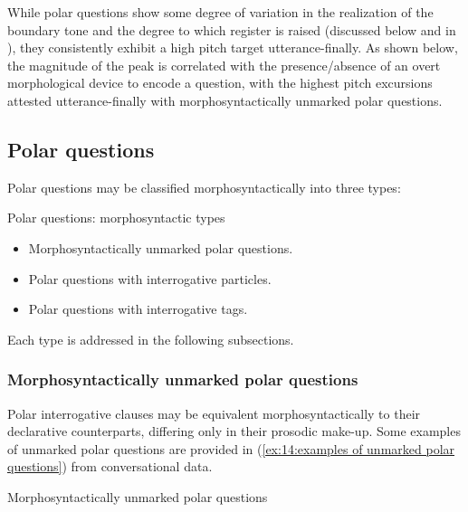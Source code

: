 While polar questions show some degree of variation in the realization of the boundary tone and the degree to which register is raised (discussed below and in ), they consistently exhibit a high pitch target utterance-finally. As shown below, the magnitude of the peak is correlated with the presence/absence of an overt morphological device to encode a question, with the highest pitch excursions attested utterance-finally with morphosyntactically unmarked polar questions.

\newpage
\subsection{Polar questions}
\label{subsec: polar questions}

Polar questions may be classified morphosyntactically into three types:

\ea\label{ex:14:morphosyntactic types of polar questions}
{Polar questions: morphosyntactic types}

    \begin{itemize}
        \item Morphosyntactically unmarked polar questions.\\
        \item Polar questions with interrogative particles.\\
        \item Polar questions with interrogative tags.\\
    \end{itemize}
\z

Each type is addressed in the following subsections.

\subsubsection{Morphosyntactically unmarked polar questions}
\label{subsubsec: morphosyntactically unmarked polar questions}

Polar interrogative clauses may be equivalent morphosyntactically to their declarative counterparts, differing only in their prosodic make-up. Some examples of unmarked polar questions are provided in (\ref{ex:14:examples of unmarked polar questions}) from conversational data.

\ea\label{ex:14:examples of unmarked polar questions}
{Morphosyntactically unmarked polar questions}

